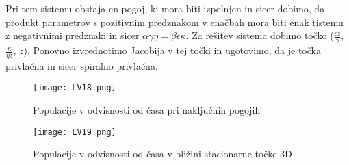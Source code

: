 \documentclass[11pt]{report}
\begin{document}
	Pri tem sistemu obstaja en pogoj, ki mora biti izpolnjen in sicer dobimo, da produkt parametrov s pozitivnim predznakom v enačbah mora biti enak tistemu z negativnimi predznaki in sicer $ \alpha \gamma \eta = \beta \epsilon \kappa $. 
	Za rešitev sistema dobimo točko ($\frac{\epsilon z }{\gamma}$, $\frac{\kappa}{\eta z}$, $z$).
	Ponovno izvrednotimo Jacobija v tej točki in ugotovimo, da je točka privlačna in sicer spiralno privlačna:
	\vspace{1mm}
	\begin{figure}[!ht]
		\centering
		\hspace{-35mm}
		\vspace{20mm}
		\begin{minipage}{0.8\textwidth}
			\centering
			\vspace{-5mm}
			\texttt{[image: LV18.png]}
			\hspace{-20mm}
			\vspace{-5mm}
			\caption{Populacije v odvisnosti od časa pri naključnih pogojih}
		\end{minipage}
	\end{figure}
	\begin{figure}[!ht]
		\centering
		\hspace{-35mm}
		\vspace{25mm}
		\begin{minipage}{0.8\textwidth}
			\centering
			\vspace{-5mm}
			\texttt{[image: LV19.png]}
			\hspace{-20mm}
			\vspace{-5mm}
			\caption{Populacije v odvisnosti od časa v bližini stacionarne točke 3D}
		\end{minipage}
	\end{figure}
	\newpage
\end{document}
